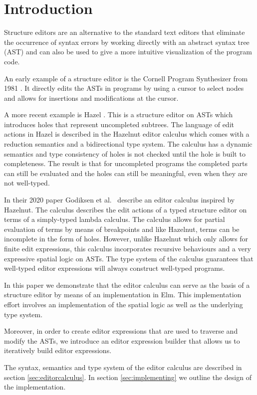 \section{Introduction}
\label{introduction}

Structure editors are an alternative to the standard text editors that
eliminate the occurrence of syntax errors by working directly with an
abstract syntax tree (AST) and can also be used to give a more intuitive
visualization of the program code.

An early example of a structure editor is the Cornell Program Synthesizer
from 1981 \cornell. It directly edits the ASTs in programs by using a cursor to
select nodes and allows for insertions and modifications at the cursor. 

A more recent example is Hazel \hazel. This is a structure editor on
ASTs which introduces holes that represent uncompleted subtrees. The
language of edit actions in Hazel is described in the Hazelnut editor
calculus which comes with a reduction semantics and a bidirectional
type system. The calculus has a dynamic semantics and type consistency
of holes is not checked until the hole is built to completeness. The
result is that for uncompleted programs the completed parts can still
be evaluated and the holes can still be meaningful, even when they are
not well-typed.

In their 2020 paper Godiksen et al. \pepm~describe an editor calculus
inspired by Hazelnut. The calculus describes the edit actions of a
typed structure editor on terms of a simply-typed lambda calculus. The
calculus allows for partial evaluation of terms by means of
breakpoints and like Hazelnut, terms can be incomplete in the form of
holes. However, unlike Hazelnut which only allows for finite edit
expressions, this calculus incorporates recursive behaviours and a
very expressive spatial logic on ASTs. The type system of the calculus
guarantees that well-typed editor expressions will always construct
well-typed programs.

In this paper we demonstrate that the editor calculus can serve as the
basis of a structure editor by means of an implementation in
Elm. This implementation effort involves an implementation of the
spatial logic as well as the underlying type system.

Moreover, in order to create editor expressions that are used to
traverse and modify the ASTs, we introduce an editor expression
builder that allows us to iteratively build editor expressions.

The syntax, semantics and type system of the editor calculus are
described in section \ref{sec:editorcalculus}. In section
\ref{sec:implementing} we outline the design of the implementation.


